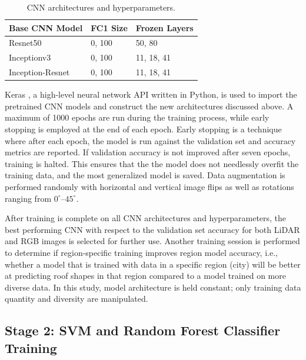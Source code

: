 \begin{table}[H]
\caption{CNN architectures and hyperparameters.}\label{table:cnn_arch}
\centering
\begin{tabular}{@{}lll@{}}
\toprule
\textbf{Base CNN Model} & \textbf{FC1 Size}  & \textbf{Frozen Layers} \\ \midrule
Resnet50          & 0, 100 & 50, 80        \\
Inceptionv3       & 0, 100 & 11, 18, 41        \\ 
Inception-Resnet  & 0, 100 & 11, 18, 41        \\\bottomrule
\end{tabular}
\end{table}


Keras \cite{chollet_keras_2015}, a high-level neural network API written in Python, is used to import the pretrained \ac{CNN} models and construct the new architectures discussed above. A maximum of 1000 epochs are run during the training process, while early stopping is employed at the end of each epoch. Early stopping is a technique where after each epoch, the model is run against the validation set and accuracy metrics are reported. If validation accuracy is not improved after seven epochs, training is halted. This ensures that the the model does not needlessly overfit the training data, and the most generalized model is saved. Data augmentation is performed randomly with horizontal and vertical image flips as well as rotations ranging from $0^{\circ}$--$45^{\circ}$.

After training is complete on all CNN architectures and hyperparameters, the best performing \ac{CNN} with respect to the validation set accuracy for both LiDAR and RGB images is selected for further use. Another training session is performed to determine if region-specific training improves region model accuracy, i.e., whether a model that is trained with data in a specific region (city) will be better at predicting roof shapes in that region compared to a model trained on more diverse data. In this study, model architecture is held constant; only training data quantity and diversity are manipulated.


\subsection{Stage 2: SVM and Random Forest Classifier Training} \label{section:rf_stage_two}

